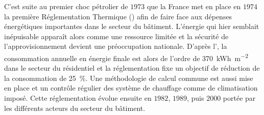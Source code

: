 C’est suite au premier choc pétrolier de $1973$ que la France met en place en $1974$ la première
Réglementation Thermique () afin de faire face aux dépenses énergétiques importantes
dans le secteur du bâtiment. L’énergie qui hier semblait inépuisable apparaît
alors comme une ressource limitée et la sécurité de l’approvisionnement devient une
préoccupation nationale. D’après l’, la consommation annuelle en énergie finale est
alors de l’ordre de \SI{370}{kWh\per\metre\squared} dans le secteur du résidentiel et la
réglementation fixe un objectif de réduction de la consommation de
\SI{25}{\percent}. Une méthodologie de calcul commune est aussi mise en place et
un contrôle régulier des système de chauffage comme de climatisation imposé.
Cette réglementation évolue ensuite en $1982$, $1989$, puis $2000$ portée par
les différents acteurs du secteur du bâtiment.

